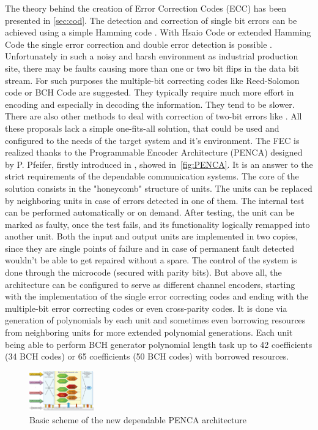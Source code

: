The theory behind the creation of Error Correction Codes (ECC) has been presented in \autoref{sec:cod}. The detection and correction of single bit errors can be achieved using a simple Hamming code \cite{art:Hamming}. With Hsaio Code or extended Hamming Code the single error correction and double error detection is possible \cite{book:Fujiwara,art:Hsiao}. Unfortunately in such a noisy and harsh environment as industrial production site, there may be faults causing more than one or two bit flips in the data bit stream. For such purposes the multiple-bit correcting codes like Reed-Solomon code \cite{Redd-Solomon} or BCH Code \cite{BCH} are suggested. They typically require much more effort in  encoding and especially in decoding the information. They tend to be slower. There are also other methods to deal with correction of two-bit errors like \cite{Hosp, Varghese}. All these proposals lack a simple one-fits-all solution, that could be used and configured to the needs of the target system and it's environment.
The FEC is realized thanks to the Programmable Encoder Architecture (PENCA) designed by P. Pfeifer, firstly introduced in \cite{art:Pfeifer}, showed in~\autoref{fig:PENCA}. It is an answer to the strict requirements of the dependable communication systems. The core of the solution consists in the "honeycomb" structure of units. The units can be replaced by neighboring units in case of errors detected in one of them. The internal test can be performed automatically or on demand. After testing, the unit can be marked as faulty, once the test fails, and its functionality logically remapped into another unit. Both the input and output units are implemented in two copies, since they are single points of failure and in case of permanent fault detected wouldn't be able to get repaired without a spare. The control of the system is done through the microcode (secured with parity bits). But above all, the architecture can be configured to serve as different channel encoders, starting with the implementation of the single error correcting codes and ending with the multiple-bit error correcting codes or even cross-parity codes. It is done via generation of polynomials by each unit and sometimes even borrowing resources from neighboring units for more extended polynomial generations. Each unit being able to perform BCH generator polynomial length task up to 42 coefficients (34 BCH codes) or 65 coefficients (50 BCH codes) with borrowed resources.
 \begin{figure}[h]
 \centering
\includegraphics[width=0.25\textwidth]{figures/PENCA.png}
\caption{Basic scheme of the new dependable PENCA architecture~\cite{art:Pfeifer}}
\label{fig:PENCA}
\end{figure}
